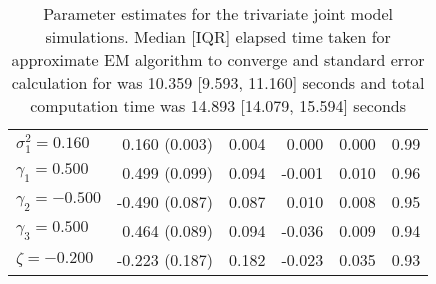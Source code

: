 \begin{table}[ht]
\begin{tabular}{l|rrrrr}
  $\sigma^2_1 = 0.160$ &  0.160 (0.003) & 0.004 &  0.000 & 0.000 & 0.99 \\ 
  $\gamma_1 = 0.500$ &  0.499 (0.099) & 0.094 & -0.001 & 0.010 & 0.96 \\ 
  $\gamma_2 = -0.500$ & -0.490 (0.087) & 0.087 &  0.010 & 0.008 & 0.95 \\ 
  $\gamma_3 = 0.500$ &  0.464 (0.089) & 0.094 & -0.036 & 0.009 & 0.94 \\ 
  $\zeta = -0.200$ & -0.223 (0.187) & 0.182 & -0.023 & 0.035 & 0.93 \\ 
   \hline
\end{tabular}
\endgroup
\caption{Parameter estimates for the trivariate joint model simulations. Median [IQR] elapsed time taken for approximate EM algorithm to converge and standard error calculation for was 10.359 [9.593, 11.160] seconds and total computation time was 14.893 [14.079, 15.594] seconds} 
\end{table}

